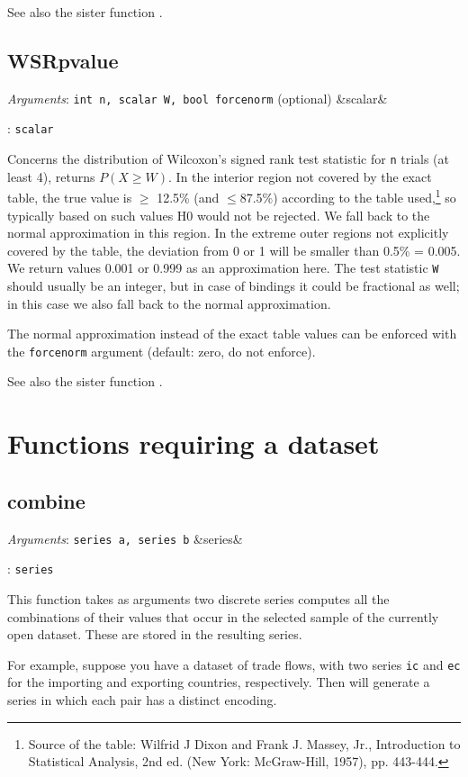 \documentclass[11pt,english]{article}
\newcommand{\ArgRet}[2]{%
  {\it Arguments}: {#1}%
  \ifx&#2&%
  \else
  \par\smallskip\noindent {\it Return type}: \texttt{#2}
  \fi%
  \par\medskip\par%
  }
\begin{document}
See also the sister function .

\subsection{WSRpvalue}

\ArgRet{\texttt{int n, scalar W, bool forcenorm} (optional)}{scalar}

Concerns the distribution of Wilcoxon's signed rank test statistic for
\texttt{n} trials (at least 4), returns $P(X\geq W)$. In the interior
region not covered by the exact table, the true value is $\geq$ 12.5\%
(and $\leq$87.5\%) according to the table used,\footnote{Source of the
  table: Wilfrid J Dixon and Frank J. Massey, Jr., Introduction to
  Statistical Analysis, 2nd ed. (New York: McGraw-Hill, 1957), pp.
  443-444.} so typically based on such values H0 would not be
rejected. We fall back to the normal approximation in this region. In
the extreme outer regions not explicitly covered by the table, the
deviation from 0 or 1 will be smaller than 0.5\% = 0.005. We return
values 0.001 or 0.999 as an approximation here. The test statistic
\texttt{W} should usually be an integer, but in case of bindings it
could be fractional as well; in this case we also fall back to the
normal approximation.

The normal approximation instead of the exact table values can be
enforced with the \texttt{forcenorm} argument (default: zero, do not
enforce).

See also the sister function .


\section{Functions requiring a dataset}

\subsection{combine}

\ArgRet{\texttt{series a, series b}}{series}

This function takes as arguments two discrete series computes all the
combinations of their values that occur in the selected sample of the
currently open dataset. These are stored in the resulting series.

For example, suppose you have a dataset of trade flows, with two
series \texttt{ic} and \texttt{ec} for the importing and exporting
countries, respectively. Then  will generate a
series in which each pair has a distinct encoding.
\end{document}

